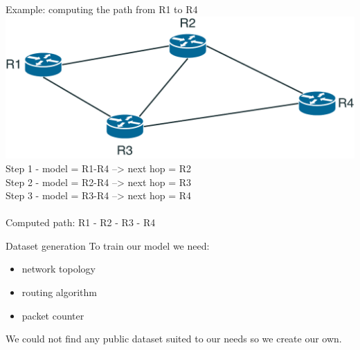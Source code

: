 \documentclass{beamer}
\begin{document}
\begin{frame}{Example: computing the path from R1 to R4}	
\includegraphics[width=\textwidth]{img/example.pdf}\\
Step 1 - model = R1-R4 --> next hop = R2\\
Step 2 - model = R2-R4 --> next hop = R3\\
Step 3 - model = R3-R4 --> next hop = R4 \\~\\
Computed path: R1 - R2 - R3 - R4\\
\end{frame}
\begin{frame}{Dataset generation}
	To train our model we need:
	\begin{itemize}
	\item network topology
	\item routing algorithm
	\item packet counter
\end{itemize}
	We could not find any public dataset suited to our needs so we create our own.
\end{frame}
\end{document}
